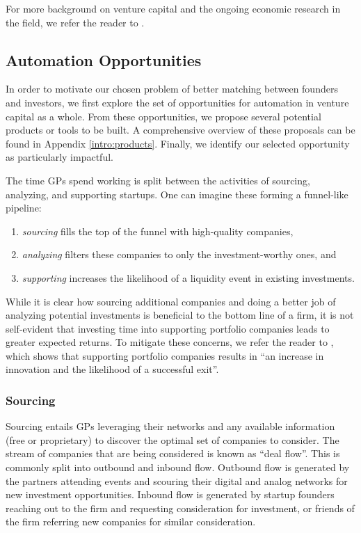 For more background on venture capital and the ongoing economic research in the field, we refer the reader to \cite{venture-survey}.

\subsection{Automation Opportunities}

In order to motivate our chosen problem of better matching between founders and investors, we first explore the set of opportunities for automation in venture capital as a whole. From these opportunities, we propose several potential products or tools to be built. A comprehensive overview of these proposals can be found in Appendix \ref{intro:products}. Finally, we identify our selected opportunity as particularly impactful.

The time GPs spend working is split between the activities of sourcing, analyzing, and supporting startups. One can imagine these forming a funnel-like pipeline:

\begin{enumerate}
  \item \textit{sourcing} fills the top of the funnel with high-quality companies,
  \item \textit{analyzing} filters these companies to only the investment-worthy ones, and
  \item \textit{supporting} increases the likelihood of a liquidity event in existing investments.
\end{enumerate}

While it is clear how sourcing additional companies and doing a better job of analyzing potential investments is beneficial to the bottom line of a firm, it is not self-evident that investing time into supporting portfolio companies leads to greater expected returns. To mitigate these concerns, we refer the reader to \cite{JOFI:JOFI12370}, which shows that supporting portfolio companies results in ``an increase in innovation and the likelihood of a successful exit''.

\subsubsection{Sourcing}

Sourcing entails GPs leveraging their networks and any available information (free or proprietary) to discover the optimal set of companies to consider. The stream of companies that are being considered is known as ``deal flow''. This is commonly split into outbound and inbound flow. Outbound flow is generated by the partners attending events and scouring their digital and analog networks for new investment opportunities. Inbound flow is generated by startup founders reaching out to the firm and requesting consideration for investment, or friends of the firm referring new companies for similar consideration.

